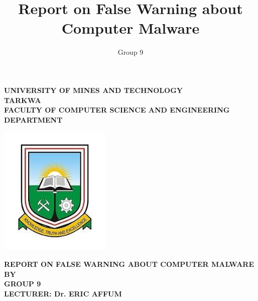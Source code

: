 \documentclass[12pt,a4paper]{report}
\author{Group 9}
\title{Report on False Warning about Computer Malware}
\newcommand{\lecturer}{Dr. ERIC AFFUM}
\newcommand{\school}{
	\centering
	\textbf{\large UNIVERSITY OF MINES AND TECHNOLOGY \\TARKWA
	\vspace{1cm}	\\FACULTY OF COMPUTER SCIENCE AND ENGINEERING  DEPARTMENT}
}
\newcommand{\rpaim}{
	\centering

 \textbf{\large REPORT ON FALSE WARNING ABOUT COMPUTER MALWARE\\ BY \\GROUP 9\\ LECTURER: \lecturer}
}
\begin{document}
	\begin{titlepage}
		\school
		\vspace{2cm}
		\begin{center}
			\includegraphics[width=0.4\textwidth]{umat_logo.jpg} %
		\end{center}
		\vspace{1cm}
		\rpaim
		\vfill

	\end{titlepage}

	

	

	

	\tableofcontents

	\listoffigures



	
	
	
	
	

%	

\end{document}
